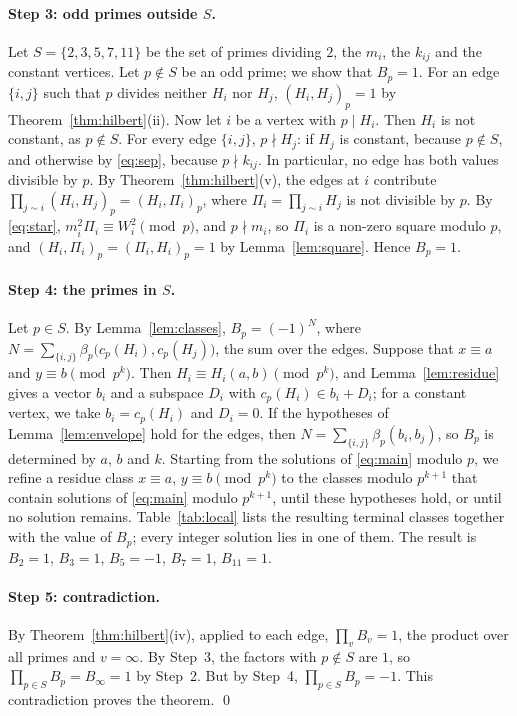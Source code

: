 \documentclass[11pt]{article}
\begin{document}
\paragraph{Step 3: odd primes outside $S$.} Let $S=\{2,3,5,7,11\}$ be the set of primes dividing $2$, the $m_{i}$, the $k_{ij}$ and the constant vertices. Let $p\notin S$ be an odd prime; we show that $B_p=1$. For an edge $\{i,j\}$ such that $p$ divides neither $H_i$ nor $H_j$, $(H_i,H_j)_p=1$ by Theorem~\ref{thm:hilbert}(ii). Now let $i$ be a vertex with $p\mid H_i$. Then $H_i$ is not constant, as $p\notin S$. For every edge $\{i,j\}$, $p\nmid H_j$: if $H_j$ is constant, because $p\notin S$, and otherwise by \eqref{eq:sep}, because $p\nmid k_{ij}$. In particular, no edge has both values divisible by $p$. By Theorem~\ref{thm:hilbert}(v), the edges at $i$ contribute $\prod_{j\sim i}(H_i,H_j)_p=(H_i,\Pi_i)_p$, where $\Pi_i=\prod_{j\sim i}H_j$ is not divisible by $p$. By \eqref{eq:star}, $m_i^2\Pi_i\equiv W_i^2\pmod p$, and $p\nmid m_i$, so $\Pi_i$ is a non-zero square modulo $p$, and $(H_i,\Pi_i)_p=(\Pi_i,H_i)_p=1$ by Lemma~\ref{lem:square}. Hence $B_p=1$.

\paragraph{Step 4: the primes in $S$.} Let $p\in S$. By Lemma~\ref{lem:classes}, $B_p=(-1)^{N}$, where $N=\sum_{\{i,j\}}\beta_p\bigl(c_p(H_i),c_p(H_j)\bigr)$, the sum over the edges. Suppose that $x\equiv a$ and $y\equiv b\pmod{p^k}$. Then $H_i\equiv H_i(a,b)\pmod{p^k}$, and Lemma~\ref{lem:residue} gives a vector $b_i$ and a subspace $D_i$ with $c_p(H_i)\in b_i+D_i$; for a constant vertex, we take $b_i=c_p(H_i)$ and $D_i=0$. If the hypotheses of Lemma~\ref{lem:envelope} hold for the edges, then $N=\sum_{\{i,j\}}\beta_p(b_i,b_j)$, so $B_p$ is determined by $a$, $b$ and $k$. Starting from the solutions of \eqref{eq:main} modulo $p$, we refine a residue class $x\equiv a$, $y\equiv b\pmod{p^k}$ to the classes modulo $p^{k+1}$ that contain solutions of \eqref{eq:main} modulo $p^{k+1}$, until these hypotheses hold, or until no solution remains. Table~\ref{tab:local} lists the resulting terminal classes together with the value of $B_p$; every integer solution lies in one of them. The result is $B_{2}=1$, $B_{3}=1$, $B_{5}=-1$, $B_{7}=1$, $B_{11}=1$.

\paragraph{Step 5: contradiction.} By Theorem~\ref{thm:hilbert}(iv), applied to each edge, $\prod_vB_v=1$, the product over all primes and $v=\infty$. By Step~3, the factors with $p\notin S$ are $1$, so $\prod_{p\in S}B_p=B_\infty=1$ by Step~2. But by Step~4, $\prod_{p\in S}B_p=-1$. This contradiction proves the theorem.
\qed
\end{document}
